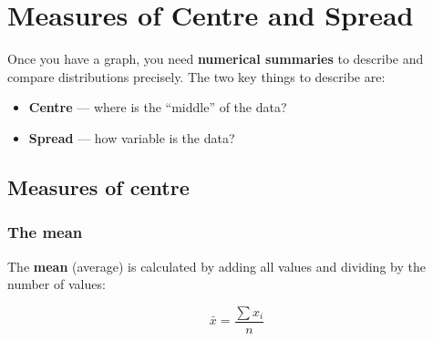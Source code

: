\documentclass[
  11pt,
  a4paper,
  oneside,
  open=any]{scrbook}
\providecommand{\tightlist}{%
  \setlength{\itemsep}{0pt}\setlength{\parskip}{0pt}}
\begin{document}

\chapter{Measures of Centre and Spread}\label{sec-measures}

Once you have a graph, you need \textbf{numerical summaries} to describe
and compare distributions precisely. The two key things to describe are:

\begin{itemize}
\tightlist
\item
  \textbf{Centre} --- where is the ``middle'' of the data?
\item
  \textbf{Spread} --- how variable is the data?
\end{itemize}

\section{Measures of centre}\label{measures-of-centre}

\subsection{The mean}\label{the-mean}

The \textbf{mean} (average) is calculated by adding all values and
dividing by the number of values:

\[\bar{x} = \frac{\sum x_i}{n}\]
\end{document}
